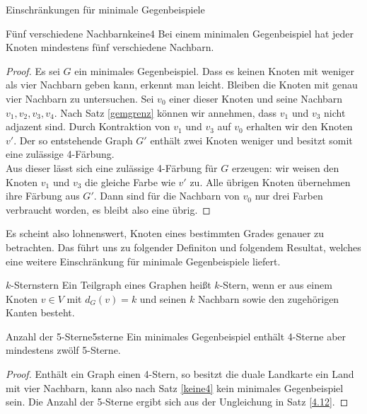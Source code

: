 \begin{section}{Einschränkungen für minimale Gegenbeispiele}
 \begin{satzl}{Fünf verschiedene Nachbarn}{keine4}
  Bei einem minimalen Gegenbeispiel hat jeder Knoten mindestens fünf verschiedene Nachbarn.
 \end{satzl}
 \begin{proof}
  Es sei $G$ ein minimales Gegenbeispiel. Dass es keinen Knoten mit weniger als vier Nachbarn geben kann, erkennt man leicht. Bleiben die Knoten mit genau vier Nachbarn zu untersuchen. Sei $v_0$ einer dieser Knoten und seine Nachbarn $v_1,v_2,v_3,v_4$. Nach Satz \ref{gemgrenz} können wir annehmen, dass $v_1$ und $v_3$ nicht adjazent sind. Durch Kontraktion von $v_1$ und $v_3$ auf $v_0$ erhalten wir den Knoten $v'$. Der so entstehende Graph $G'$ enthält zwei Knoten weniger und besitzt somit eine zulässige 4-Färbung.\\
  Aus dieser lässt sich eine zulässige 4-Färbung für $G$ erzeugen: wir weisen den Knoten $v_1$ und $v_3$ die gleiche Farbe wie $v'$ zu. Alle übrigen Knoten übernehmen ihre Färbung aus $G'$. Dann sind für die Nachbarn von $v_0$ nur drei Farben verbraucht worden, es bleibt also eine übrig.
 \end{proof}
 
 Es scheint also lohnenswert, Knoten eines bestimmten Grades genauer zu betrachten. Das führt uns zu folgender Definiton und folgendem Resultat, welches eine weitere Einschränkung für minimale Gegenbeispiele liefert.
 
 \begin{definitionl}{$k$-Stern}{stern}
  Ein Teilgraph eines Graphen heißt $k$-Stern, wenn er aus einem Knoten $v \in V$ mit $d_G(v) = k$ und seinen $k$ Nachbarn sowie den zugehörigen Kanten besteht.
 \end{definitionl}
 
 \begin{satzl}{Anzahl der 5-Sterne}{5sterne}
  Ein minimales Gegenbeispiel enthält 4-Sterne aber mindestens zwölf 5-Sterne.
 \end{satzl}
 \begin{proof}
  Enthält ein Graph einen 4-Stern, so besitzt die duale Landkarte ein Land mit vier Nachbarn, kann also nach Satz \ref{keine4} kein minimales Gegenbeispiel sein. Die Anzahl der 5-Sterne ergibt sich aus der Ungleichung in Satz \ref{4.12}.
 \end{proof}
\end{section}